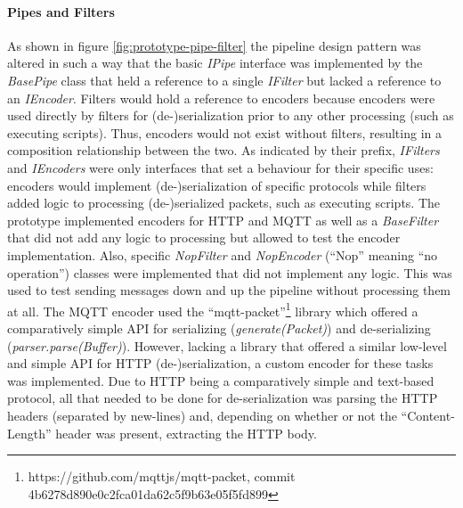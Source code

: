 \paragraph{Pipes and Filters} As shown in figure \ref{fig:prototype-pipe-filter} the pipeline design pattern was altered in such a way that the basic \emph{IPipe} interface was implemented by the \emph{BasePipe} class that held a reference to a single \emph{IFilter} but lacked a reference to an \emph{IEncoder}. Filters would hold a reference to encoders because encoders were used directly by filters for (de-)serialization prior to any other processing (such as executing scripts). Thus, encoders would not exist without filters, resulting in a composition relationship between the two. As indicated by their prefix, \emph{IFilters} and \emph{IEncoders} were only interfaces that set a behaviour for their specific uses: encoders would implement (de-)serialization of specific protocols while filters added logic to processing (de-)serialized packets, such as executing scripts. The prototype implemented encoders for \ac{HTTP} and \ac{MQTT} as well as a \emph{BaseFilter} that did not add any logic to processing but allowed to test the encoder implementation. Also, specific \emph{NopFilter} and \emph{NopEncoder} (\enquote{Nop} meaning \enquote{no operation}) classes were implemented that did not implement any logic. This was used to test sending messages down and up the pipeline without processing them at all. The \ac{MQTT} encoder used the \enquote{mqtt-packet}\footnote{https://github.com/mqttjs/mqtt-packet, commit 4b6278d890e0c2fca01da62c5f9b63e05f5fd899} library which offered a comparatively simple API for serializing (\emph{generate(Packet)}) and de-serializing (\emph{parser.parse(Buffer)}). However, lacking a library that offered a similar low-level and simple API for \ac{HTTP} (de-)serialization, a custom encoder for these tasks was implemented. Due to \ac{HTTP} being a comparatively simple and text-based protocol, all that needed to be done for de-serialization was parsing the \ac{HTTP} headers (separated by new-lines) and, depending on whether or not the \enquote{Content-Length} header was present, extracting the \ac{HTTP} body.

